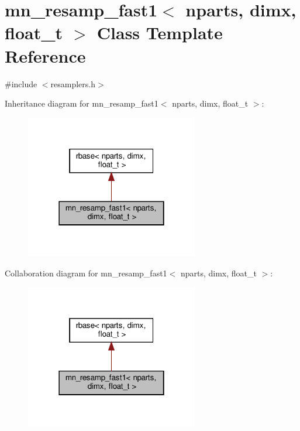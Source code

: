 \hypertarget{classmn__resamp__fast1}{}\section{mn\+\_\+resamp\+\_\+fast1$<$ nparts, dimx, float\+\_\+t $>$ Class Template Reference}
\label{classmn__resamp__fast1}


{\ttfamily \#include $<$resamplers.\+h$>$}



Inheritance diagram for mn\+\_\+resamp\+\_\+fast1$<$ nparts, dimx, float\+\_\+t $>$\+:\nopagebreak
\begin{figure}[H]
\begin{center}
\leavevmode
\includegraphics[width=214pt]{classmn__resamp__fast1__inherit__graph}
\end{center}
\end{figure}


Collaboration diagram for mn\+\_\+resamp\+\_\+fast1$<$ nparts, dimx, float\+\_\+t $>$\+:\nopagebreak
\begin{figure}[H]
\begin{center}
\leavevmode
\includegraphics[width=214pt]{classmn__resamp__fast1__coll__graph}
\end{center}
\end{figure}
